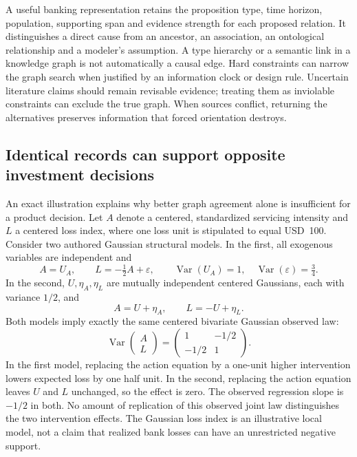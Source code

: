 A useful banking representation retains the proposition type, time horizon,
population, supporting span and evidence strength for each proposed relation.
It distinguishes a direct cause from an ancestor, an association, an ontological
relationship and a modeler's assumption. A type hierarchy or a semantic link in
a knowledge graph is not automatically a causal edge. Hard constraints can narrow
the graph search when justified by an information clock or design rule. Uncertain
literature claims should remain revisable evidence; treating them as inviolable
constraints can exclude the true graph. When sources conflict, returning the
alternatives preserves information that forced orientation destroys.

\subsection{Identical records can support opposite investment decisions}
\label{exec22:domain-value}

An exact illustration explains why better graph agreement alone is insufficient
for a product decision. Let \(A\) denote a centered, standardized servicing
intensity and \(L\) a centered loss index, where one loss unit is stipulated to
equal USD~100. Consider two authored Gaussian structural models. In the first,
all exogenous variables are independent and
\begin{equation}
 A=U_A,\qquad L=-\tfrac12 A+\varepsilon,
 \qquad \operatorname{Var}(U_A)=1,\quad
 \operatorname{Var}(\varepsilon)=\tfrac34.
 \label{exec22:domain-causal}
\end{equation}
In the second, \(U,\eta_A,\eta_L\) are mutually independent centered Gaussians,
each with variance \(1/2\), and
\begin{equation}
 A=U+\eta_A,\qquad L=-U+\eta_L.
 \label{exec22:domain-latent}
\end{equation}
Both models imply exactly the same centered bivariate Gaussian observed law:
\begin{equation}
 \operatorname{Var}\!\begin{pmatrix}A\\L\end{pmatrix}=
 \begin{pmatrix}1&-1/2\\-1/2&1\end{pmatrix}.
 \label{exec22:domain-covariance}
\end{equation}
In the first model, replacing the action equation
by a one-unit higher intervention lowers expected loss by one half unit. In the
second, replacing the action equation leaves \(U\) and \(L\) unchanged, so the
effect is zero. The observed regression slope is \(-1/2\) in both. No amount
of replication of this observed joint law distinguishes the two intervention
effects. The Gaussian loss index is an illustrative local model, not a claim
that realized bank losses can have an unrestricted negative support.
\citep{exec22_domain_reference}

